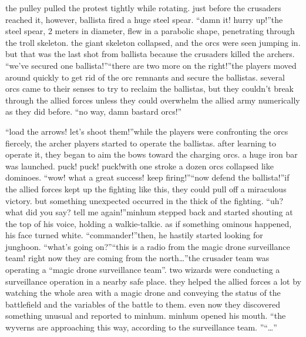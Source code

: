  the pulley pulled the protest tightly while rotating.
just before the crusaders reached it, however, ballista fired a huge steel spear.
“damn it! hurry up!”the steel spear, 2 meters in diameter, flew in a parabolic shape, penetrating through the troll skeleton.
 the giant skeleton collapsed, and the orcs were seen jumping in.
but that was the last shot from ballista because the crusaders killed the archers.
“we’ve secured one ballista!”“there are two more on the right!”the players moved around quickly to get rid of the orc remnants and secure the ballistas.
several orcs came to their senses to try to reclaim the ballistas, but they couldn’t break through the allied forces unless they could overwhelm the allied army numerically as they did before.
“no way, damn bastard orcs!”

“load the arrows! let’s shoot them!”while the players were confronting the orcs fiercely, the archer players started to operate the ballistas.
 after learning to operate it, they began to aim the bows toward the charging orcs.
a huge iron bar was launched.
puck! puck! puck!with one stroke a dozen orcs collapsed like dominoes.
“wow! what a great success! keep firing!”“now defend the ballista!”if the allied forces kept up the fighting like this, they could pull off a miraculous victory.
but something unexpected occurred in the thick of the fighting.
“uh? what did you say? tell me again!”minhum stepped back and started shouting at the top of his voice, holding a walkie-talkie.
as if something ominous happened, his face turned white.
“commander!”then, he hastily started looking for junghoon.
“what’s going on?”“this is a radio from the magic drone surveillance team! right now they are coming from the north…”the crusader team was operating a “magic drone surveillance team”.
two wizards were conducting a surveillance operation in a nearby safe place.
 they helped the allied forces a lot by watching the whole area with a magic drone and conveying the status of the battlefield and the variables of the battle to them.
even now they discovered something unusual and reported to minhum.
minhum opened his mouth.
“the wyverns are approaching this way, according to the surveillance team.
”“…”

 